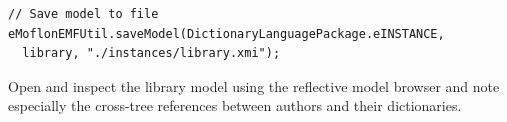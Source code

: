 \begin{enumerate}
\begin{verbatim}
// Save model to file
eMoflonEMFUtil.saveModel(DictionaryLanguagePackage.eINSTANCE, 
  library, "./instances/library.xmi");  
\end{verbatim}
  
Open and inspect the library model using the reflective model browser and note especially the cross-tree references between authors and their dictionaries. 
\end{enumerate}